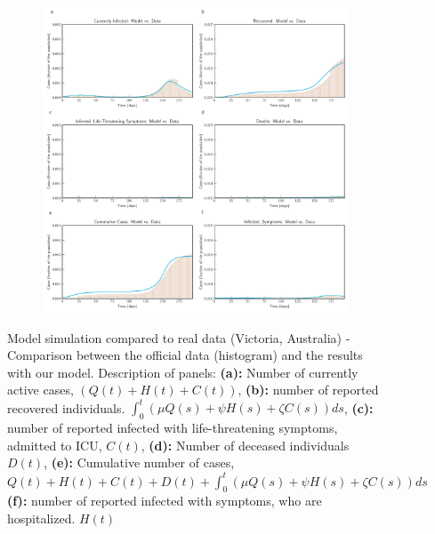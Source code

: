 \documentclass[authoryear,preprint]{elsarticle}
\begin{document}
\begin{figure}[t!]
	\centering
	\begin{subfigure}[b]{\textwidth}
		\centering
		\includegraphics[width=1\linewidth]{Victoria_plot_model_data.pdf}
	\end{subfigure}
	\caption{Model simulation compared to real data (Victoria, Australia) - Comparison between the official data (histogram) and the results with our model. Description of panels: \textbf{(a):} Number of currently active cases, $\left( Q(t) + H(t) + C(t)\right)$, \textbf{(b):} number of reported recovered individuals. $\int_{0}^{t}{\left( \mu Q(s) + \psi H(s) + \zeta  C(s) \right) ds}$, \textbf{(c):} number of reported infected with life-threatening symptoms, admitted to ICU, $C(t)$, \textbf{(d):} Number of deceased individuals $D(t)$, \textbf{(e):} Cumulative number of cases, $Q(t) + H(t) + C(t) + D(t) + \int_{0}^{t}{\left( \mu Q(s) + \psi H(s) + \zeta  C(s) \right) ds}$ \textbf{(f):} number of reported infected with symptoms, who are hospitalized. $H(t)$}
	\label{fig10A} 
\end{figure}
%
%
\end{document}
